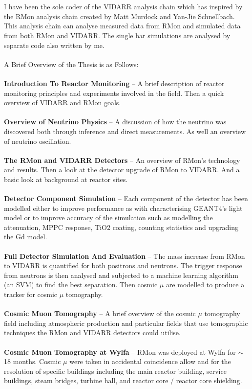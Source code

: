 \\\\I have been the sole coder of the VIDARR analysis chain which has inspired by the RMon analysis chain created by Matt Murdock and Yan-Jie Schnellbach. This analysis chain can analyse measured data from RMon and simulated data from both RMon and VIDARR. The single bar simulations are analysed by separate code also written by me. 
\\\\A Brief Overview of the Thesis is as Follows:
\\\\\textbf{Introduction To Reactor Monitoring} -- A brief description of reactor monitoring principles and experiments involved in the field. Then a quick overview of VIDARR and RMon goals.  
\\\\\textbf{Overview of Neutrino Physics} -- A discussion of how the neutrino was discovered both through inference and direct measurements. As well an overview of neutrino oscillation.
\\\\\textbf{The RMon and VIDARR Detectors} -- An overview of RMon's technology and results. Then a look at the detector upgrade of RMon to VIDARR. And a basic look at background at reactor sites.
\\\\\textbf{Detector Component Simulation} -- Each component of the detector has been modelled either to improve performance as with characterising GEANT4's light model or to improve accuracy of the simulation such as modelling the attenuation, MPPC response, TiO2 coating, counting statistics and upgrading the Gd model. 
\\\\\textbf{Full Detector Simulation And Evaluation} -- The mass increase from RMon to VIDARR is quantified for both positrons and neutrons. The trigger response from neutrons is then analysed and subjected to a machine learning algorithm (an SVM) to find the best separation. Then cosmic $\mu$ are modelled to produce a tracker for cosmic $\mu$ tomography.
\\\\\textbf{Cosmic Muon Tomography} -- A brief overview of the cosmic $\mu$ tomography field including atmospheric production and particular fields that use tomographic techniques the RMon and VIDARR detectors could utilise. 
\\\\\textbf{Cosmic Muon Tomography at Wylfa} -- RMon was deployed at Wylfa for $\sim$ 18 months. Cosmic $\mu$ were taken in accidental coincidence allow and for the resolution of specific buildings including the main reactor building, service buildings, steam bridges, turbine hall, and reactor core / reactor core shielding.